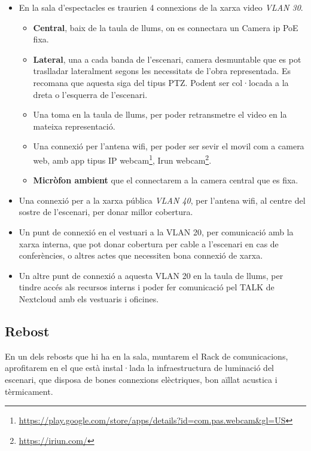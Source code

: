 \documentclass[
  10pt,
]{krantz}
\DeclareRobustCommand{\href}[2]{#2\footnote{\url{#1}}}
\providecommand{\tightlist}{%
  \setlength{\itemsep}{0pt}\setlength{\parskip}{0pt}}
\begin{document}
\begin{itemize}
\item
  En la sala d'espectacles es traurien 4 connexions de la xarxa video \emph{VLAN 30}.

  \begin{itemize}
  \tightlist
  \item
    \textbf{Central}, baix de la taula de llums, on es connectara un Camera ip PoE fixa.
  \item
    \textbf{Lateral}, una a cada banda de l'escenari, camera desmuntable que es pot traslladar lateralment segons les necessitats de l'obra representada. Es recomana que aquesta siga del tipus PTZ. Podent ser col·locada a la dreta o l'esquerra de l'escenari.
  \item
    Una toma en la taula de llums, per poder retransmetre el video en la mateixa representació.
  \item
    Una connexió per l'antena wifi, per poder ser sevir el movil com a camera web, amb app tipus \href{https://play.google.com/store/apps/details?id=com.pas.webcam\&gl=US}{IP webcam}, \href{https://iriun.com/}{Irun webcam}.
  \item
    \textbf{Micròfon ambient} que el connectarem a la camera central que es fixa.
  \end{itemize}
\item
  Una connexió per a la xarxa pública \emph{VLAN 40}, per l'antena wifi, al centre del sostre de l'escenari, per donar millor cobertura.
\item
  Un punt de connexió en el vestuari a la VLAN 20, per comunicació amb la xarxa interna, que pot donar cobertura per cable a l'escenari en cas de conferències, o altres actes que necessiten bona connexió de xarxa.
\item
  Un altre punt de connexió a aquesta VLAN 20 en la taula de llums, per tindre accés als recursos interns i poder fer comunicació pel TALK de Nextcloud amb els vestuaris i oficines.
\end{itemize}

\hypertarget{rebost}{%
\subsection{Rebost}\label{rebost}}

En un dels rebosts que hi ha en la sala, muntarem el Rack de comunicacions, aprofitarem en el que està instal·lada la infraestructura de luminació del escenari, que disposa de bones connexions elèctriques, bon aïllat acustica i tèrmicament.
\end{document}
